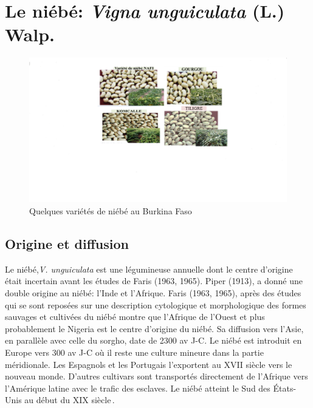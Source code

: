 \documentclass[a4paper,11pt]{article}
\begin{document}
  



\section{Le niébé: \emph{Vigna unguiculata} (L.) Walp.}
\begin{figure}%
  \begin{center}
   \includegraphics[width=12cm]{images/graines_niebe}
  \end{center}
\caption{Quelques variétés de niébé au Burkina Faso}
\end{figure}

\newpage



\subsection{Origine et diffusion}

Le niébé,\emph{V. unguiculata} est une légumineuse annuelle dont le centre
d’origine était incertain avant les études de Faris (1963,
1965). Piper (1913), a donné une double origine au niébé: l’Inde et
l’Afrique. Faris (1963, 1965), après des études qui se sont reposées
sur une description cytologique et morphologique des formes sauvages
et cultivées du niébé montre que l’Afrique de l’Ouest et plus
probablement le Nigeria est le centre d’origine du niébé. Sa diffusion
vers l’Asie, en parallèle avec celle du sorgho, date de 2300 av
J-C. Le niébé est introduit en Europe vers 300 av J-C où il reste une
culture mineure dans la partie méridionale. Les Espagnols et les
Portugais l’exportent au XVII\ieme{} siècle vers le nouveau monde. D’autres
cultivars sont transportés directement de l’Afrique vers l’Amérique
latine avec le trafic des esclaves. Le niébé atteint le Sud des
États-Unis au début du XIX\ieme{} siècle\,\cite{Sawadogo_2009}.
\end{document}
